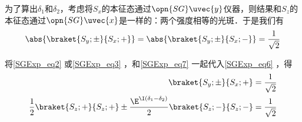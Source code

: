 为了算出$\delta_1$和$\delta_2$，考虑将$S_x$的本征态通过$\opn{SG}\uvec{y}$仪器，则结果和$S_z$的本征态通过$\opn{SG}\uvec{x}$是一样的：两个强度相等的光斑．于是我们有
\begin{equation}\label{SGExp_eq6}
\abs{\braket{S_y; \pm}{S_x; +}}=\abs{\braket{S_y; \pm}{S_x; -}}=\frac{1}{\sqrt{2}}
\end{equation}

将\autoref{SGExp_eq2} 或\autoref{SGExp_eq3} ，和\autoref{SGExp_eq7} 一起代入\autoref{SGExp_eq6} ，得
\begin{equation}
\begin{aligned}
\braket{S_y; \pm}{S_x; +}&=\frac{1}{\sqrt{2}}\\
\frac{1}{2}\braket{S_z; +}{S_z; +} \pm \frac{\E^{\I(\delta_1-\delta_2)}}{2}\braket{S_z; -}{S_z; -}&=\frac{1}{\sqrt{2}}
\end{aligned}
\end{equation}















